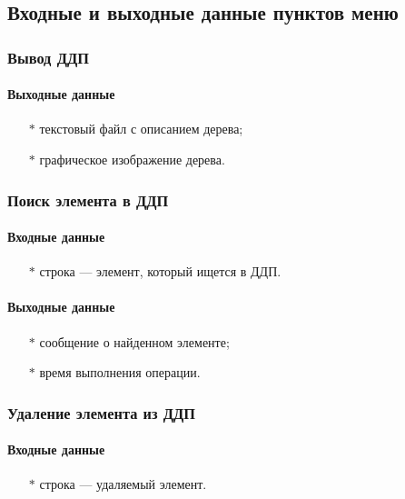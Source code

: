 \documentclass[a4paper,12pt]{extarticle}
\begin{document}
\subsection{Входные и выходные данные пунктов меню}
\subsubsection{Вывод ДДП}

\paragraph{Выходные данные}
\begin{itemize}
    \item[$*$] текстовый файл с описанием дерева;
    \item[$*$] графическое изображение дерева.
\end{itemize}

\subsubsection{Поиск элемента в ДДП}

\paragraph{Входные данные}
\begin{itemize}
    \item[$*$] строка --- элемент, который ищется в ДДП.
\end{itemize}

\paragraph{Выходные данные}
\begin{itemize}
    \item[$*$] сообщение о найденном элементе;
    \item[$*$] время выполнения операции.
\end{itemize}

\subsubsection{Удаление элемента из ДДП}

\paragraph{Входные данные}
\begin{itemize}
    \item[$*$] строка --- удаляемый элемент.
\end{itemize}
\end{document}
